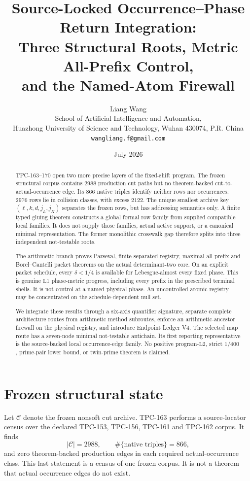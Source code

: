 \documentclass[11pt]{article}
\title{\textbf{Source-Locked Occurrence--Phase Return Integration:}\\
\textbf{Three Structural Roots, Metric All-Prefix Control,}\\
\textbf{and the Named-Atom Firewall}}
\author{Liang Wang\\
School of Artificial Intelligence and Automation,\\
Huazhong University of Science and Technology, Wuhan 430074, P.R. China\\
\texttt{wangliang.f@gmail.com}}
\date{July 2026}
\theoremstyle{definition}
\theoremstyle{remark}
\newcommand{\Lone}{\mathrm{L1}}
\newcommand{\Ltwo}{\mathrm{L2}}
\begin{document}
\maketitle

\begin{abstract}
TPC-163--170 open two more precise layers of the fixed-shift
program.  The frozen structural corpus contains \(2988\) production
cut paths but no theorem-backed cut-to-actual-occurrence edge.  Its
\(866\) native triples identify neither rows nor occurrences: \(2976\)
rows lie in collision classes, with excess \(2122\).  The unique
smallest archive key
\((\ell,k,d,j_L,j_K)\) separates the frozen rows, but has addressing
semantics only.  A finite typed gluing theorem constructs a global
formal row family from supplied compatible local families.  It does
not supply those families, actual active support, or a canonical
minimal representation.  The former monolithic crosswalk gap
therefore splits into three independent not-testable roots.

The arithmetic branch proves Parseval, finite separated-registry,
maximal all-prefix and Borel--Cantelli packet theorems on the actual
determinant-two core.  On an explicit packet schedule, every
\(\delta<1/4\) is available for Lebesgue-almost every fixed phase.
This is genuine \(\Lone\) phase-metric progress, including every
prefix in the prescribed terminal shells.  It is not control at a
named physical phase.  An uncontrolled atomic registry may be
concentrated on the schedule-dependent null set.

We integrate these results through a six-axis quantifier signature,
separate complete architecture routes from arithmetic method
subroutes, enforce an arithmetic-ancestor firewall on the physical
registry, and introduce Endpoint Ledger V4.  The selected map route
has a seven-node minimal not-testable antichain.  Its first reporting
representative is the source-backed local occurrence-edge family.
No positive program-\(\Ltwo\), strict \(1/400\), prime-pair lower
bound, or twin-prime theorem is claimed.
\end{abstract}

\section{Frozen structural state}

Let \(\mathcal C\) denote the frozen nonsoft cut archive.  TPC-163
performs a source-locator census over the declared TPC-153, TPC-156,
TPC-161 and TPC-162 corpus.  It finds
\[
 |\mathcal C|=2988,\qquad
 \#\{\text{native triples}\}=866,
\tag{1}\label{eq:census}
\]
and zero theorem-backed production edges in each required
actual-occurrence class.  This last statement is a census of one
frozen corpus.  It is not a theorem that actual occurrence edges do
not exist.
\end{document}
